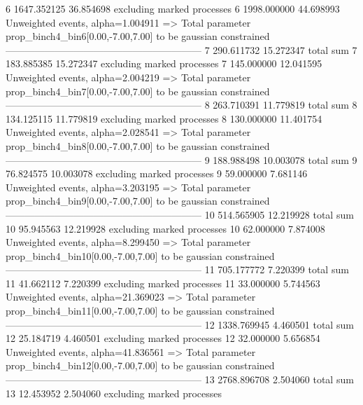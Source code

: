 6          1647.352125     36.854698       excluding marked processes    
6          1998.000000     44.698993       Unweighted events, alpha=1.004911
  => Total parameter prop_binch4_bin6[0.00,-7.00,7.00] to be gaussian constrained
------------------------------------------------------------
7          290.611732      15.272347       total sum                     
7          183.885385      15.272347       excluding marked processes    
7          145.000000      12.041595       Unweighted events, alpha=2.004219
  => Total parameter prop_binch4_bin7[0.00,-7.00,7.00] to be gaussian constrained
------------------------------------------------------------
8          263.710391      11.779819       total sum                     
8          134.125115      11.779819       excluding marked processes    
8          130.000000      11.401754       Unweighted events, alpha=2.028541
  => Total parameter prop_binch4_bin8[0.00,-7.00,7.00] to be gaussian constrained
------------------------------------------------------------
9          188.988498      10.003078       total sum                     
9          76.824575       10.003078       excluding marked processes    
9          59.000000       7.681146        Unweighted events, alpha=3.203195
  => Total parameter prop_binch4_bin9[0.00,-7.00,7.00] to be gaussian constrained
------------------------------------------------------------
10         514.565905      12.219928       total sum                     
10         95.945563       12.219928       excluding marked processes    
10         62.000000       7.874008        Unweighted events, alpha=8.299450
  => Total parameter prop_binch4_bin10[0.00,-7.00,7.00] to be gaussian constrained
------------------------------------------------------------
11         705.177772      7.220399        total sum                     
11         41.662112       7.220399        excluding marked processes    
11         33.000000       5.744563        Unweighted events, alpha=21.369023
  => Total parameter prop_binch4_bin11[0.00,-7.00,7.00] to be gaussian constrained
------------------------------------------------------------
12         1338.769945     4.460501        total sum                     
12         25.184719       4.460501        excluding marked processes    
12         32.000000       5.656854        Unweighted events, alpha=41.836561
  => Total parameter prop_binch4_bin12[0.00,-7.00,7.00] to be gaussian constrained
------------------------------------------------------------
13         2768.896708     2.504060        total sum                     
13         12.453952       2.504060        excluding marked processes    
